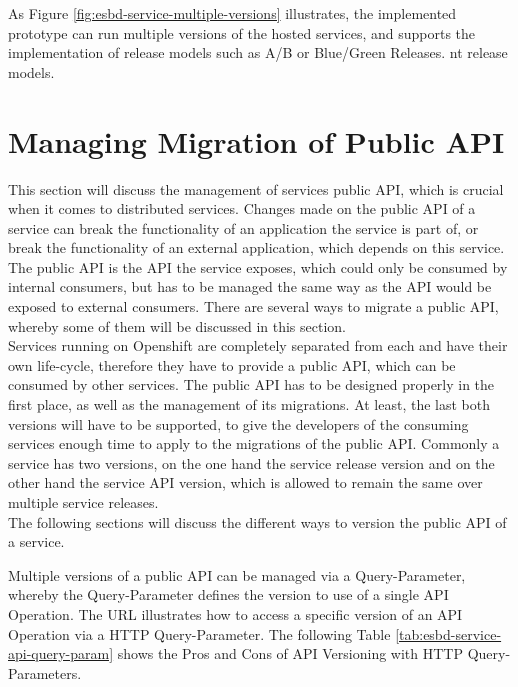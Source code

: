 As Figure \vref{fig:esbd-service-multiple-versions} illustrates, the implemented prototype can run multiple versions of the hosted services, and supports the implementation of release models such as A/B or Blue/Green Releases. nt release models.
\newpage

\section{Managing Migration of Public API}
\label{sec:esbd-multi-stage-env}
This section will discuss the management of services public API, which is crucial when it comes to distributed services. Changes made on the public API of a service can break the functionality of an application the service is part of, or break the functionality of an external application, which depends on this service. The public API is the API the service exposes, which could only be consumed by internal consumers, but has to be managed the same way as the API would be exposed to external consumers. There are several ways to migrate a public API, whereby some of them will be discussed in this section. \\  

Services running on Openshift are completely separated from each and have their own life-cycle, therefore they have to provide a public API, which can be consumed by other services. The public API has to be designed properly in the first place, as well as the management of its migrations. At least, the last both versions will have to be supported, to give the developers of the consuming services enough time to apply to the migrations of the public API. Commonly a service has two versions, on the one hand the service release version and on the other hand the service API version, which is allowed to remain the same over multiple service releases. \\

The following sections will discuss the different ways to version the public API of a service.

Multiple versions of a public API can be managed via a Query-Parameter, whereby the Query-Parameter defines the version to use of a single API Operation. The URL  illustrates how to access a specific version of an API Operation via a HTTP Query-Parameter. The following Table \vref{tab:esbd-service-api-query-param} shows the Pros and Cons of API Versioning with HTTP Query-Parameters.


